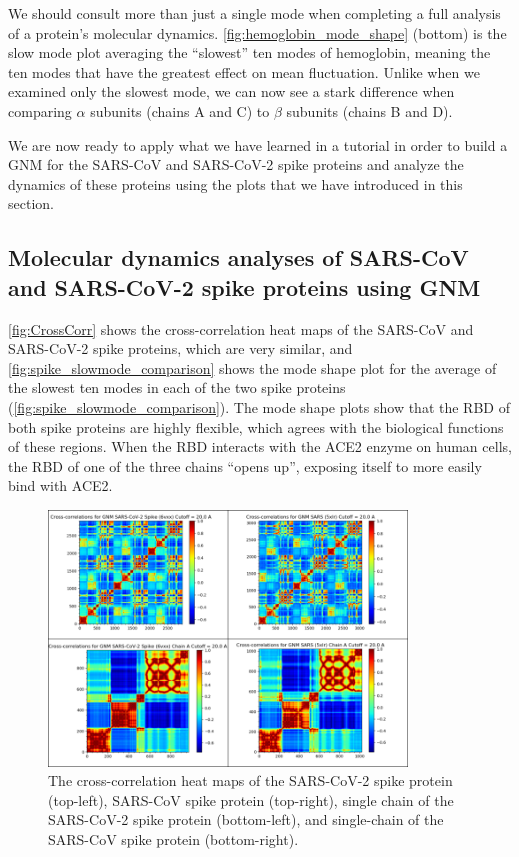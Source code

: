 We should consult more than just a single mode when completing a full analysis of a protein's molecular dynamics. \autoref{fig:hemoglobin_mode_shape} (bottom) is the slow mode plot averaging the ``slowest'' ten modes of hemoglobin, meaning the ten modes that have the greatest effect on mean fluctuation. Unlike when we examined only the slowest mode, we can now see a stark difference when comparing $\alpha$ subunits (chains A and C) to $\beta$ subunits (chains B and D).

We are now ready to apply what we have learned in a tutorial in order to build a GNM for the SARS-CoV and SARS-CoV-2 spike proteins and analyze the dynamics of these proteins using the plots that we have introduced in this section.

\FloatBarrier
{}
\subsection{Molecular dynamics analyses of SARS-CoV and SARS-CoV-2 spike proteins using GNM}

\autoref{fig:CrossCorr} shows the cross-correlation heat maps of the SARS-CoV and SARS-CoV-2 spike proteins, which are very similar, and \autoref{fig:spike_slowmode_comparison} shows the mode shape plot for the average of the slowest ten modes in each of the two spike proteins (\autoref{fig:spike_slowmode_comparison}). The mode shape plots show that the RBD of both spike proteins are highly flexible, which agrees with the biological functions of these regions. When the RBD interacts with the ACE2 enzyme on human cells, the RBD of one of the three chains ``opens up'', exposing itself to more easily bind with ACE2.\\

\begin{figure}[h]
	\centering
	\mySfFamily
	\includegraphics[width = 0.85\textwidth]{../images/CrossCorr.png}
	\caption{The cross-correlation heat maps of the SARS-CoV-2 spike protein (top-left), SARS-CoV spike protein (top-right), single chain of the SARS-CoV-2 spike protein (bottom-left), and single-chain of the SARS-CoV spike protein (bottom-right).}
	\label{fig:CrossCorr}
\end{figure}

